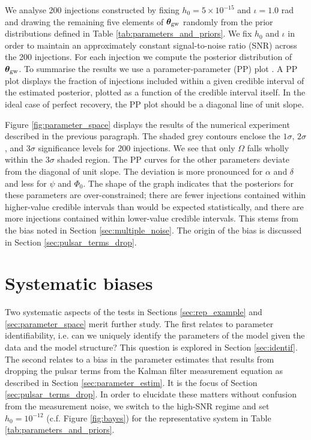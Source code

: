 \documentclass[fleqn,usenatbib,useAMS]{mnras}
\begin{document}
We analyse 200 injections constructed by fixing $h_0 = 5 \times 10^{-15}$ and $\iota =1.0$ rad and drawing the remaining five elements of $\boldsymbol{\theta}_{\rm gw}$ randomly from the prior distributions defined in Table \ref{tab:parameters_and_priors}. We fix $h_0$ and $\iota$ in order to maintain an approximately constant signal-to-noise ratio (SNR) across the 200 injections. For each injection we compute the posterior distribution of ${\boldsymbol{\theta}}_{\rm gw}$. To summarise the results we use a parameter-parameter (PP) plot \citep{doi:10.1198/106186006X136976}. A PP plot displays the fraction of injections included within a given credible interval of the estimated posterior, plotted as a function of the credible interval itself. In the ideal case of perfect recovery, the PP plot should be a diagonal line of unit slope. \newline 

 Figure \ref{fig:parameter_space} displays the results of the numerical experiment described in the previous paragraph. The shaded grey contours enclose the $1\sigma$, $2\sigma$, and $3\sigma$ significance levels for 200 injections. We see that only $\Omega$ falls wholly within the $3\sigma$ shaded region. The PP curves for the other parameters deviate from the diagonal of unit slope. The deviation is more pronounced for $\alpha$ and $\delta$ and less for $\psi$ and $\Phi_0$. The shape of the graph indicates that the posteriors for these parameters are over-constrained; there are fewer injections contained within higher-value credible intervals than would be expected statistically, and there are more injections contained within lower-value credible intervals. This stems from the bias noted in Section \ref{sec:multiple_noise}. The origin of the bias is discussed in Section \ref{sec:pulsar_terms_drop}. 
 
\section{Systematic biases} \label{sec:bias_and_identifiability}
 Two systematic aspects of the tests in Sections \ref{sec:rep_example} and \ref{sec:parameter_space} merit further study. The first relates to parameter identifiability, i.e. can we uniquely identify the parameters of the model given the data and the model structure? This question is explored in Section \ref{sec:identif}. The second relates to a bias in the parameter estimates that results from dropping the pulsar terms from the Kalman filter measurement equation as described in Section \ref{sec:parameter_estim}. It is the focus of Section \ref{sec:pulsar_terms_drop}. In order to elucidate these matters without confusion from the measurement noise, we switch to the high-SNR regime and set $h_0 = 10^{-12}$ (c.f. Figure \ref{fig:bayes}) for the representative system in Table \ref{tab:parameters_and_priors}.
\end{document}
